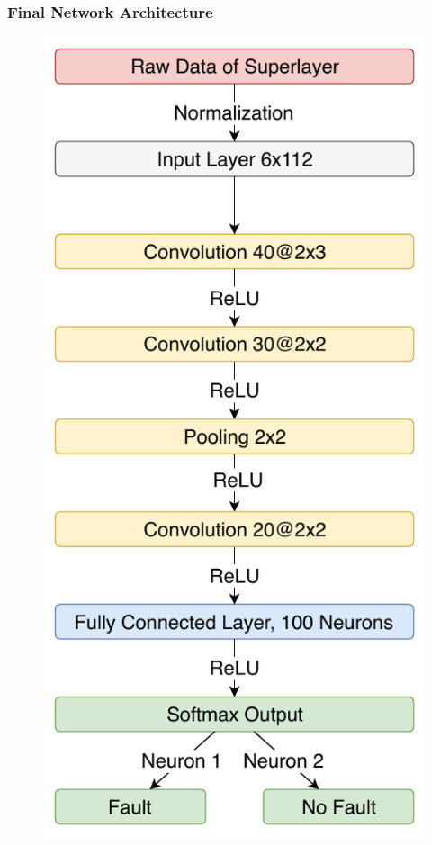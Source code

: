 \begin{frame}
  \frametitle{Final Network Architecture}
  \begin{figure}
    \includegraphics[height=.8\textheight]{../figures/fault_architecture}
  \end{figure}
\end{frame}

